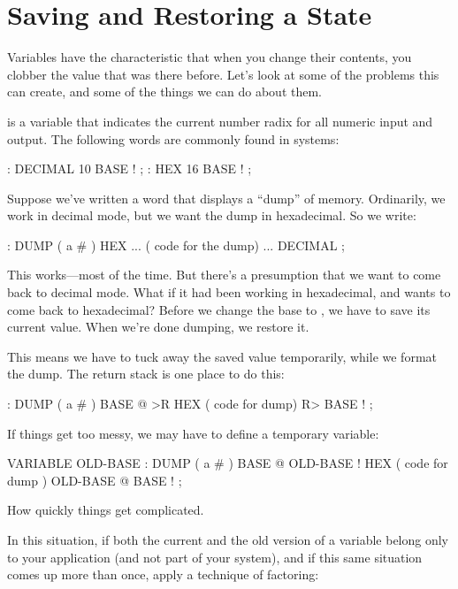 \section{Saving and Restoring a State}

Variables have the characteristic that when you change their contents,
you clobber the value that was there before. Let's look at some of the
problems this can create, and some of the things we can do about them.

 is a variable that indicates the current
number radix for all numeric input and output. The following words are
commonly found in \Forth{} systems:

\begin{Code}
: DECIMAL   10 BASE ! ;
: HEX   16 BASE ! ;
\end{Code}
Suppose we've written a word that displays a ``dump'' of memory. Ordinarily,
we work in decimal mode, but we want the dump in hexadecimal. So we write:

\begin{Code}
: DUMP  ( a # )
   HEX   ...   ( code for the dump) ... DECIMAL ;
\end{Code}
This works---most of the time. But there's a presumption that we want to
come back to decimal mode. What if it had been working in hexadecimal,
and wants to come back to hexadecimal? Before we change the base to
, we have to save its current value. When we're done dumping, we
restore it.

This means we have to tuck away the saved value temporarily,
while we format the dump. The return stack is one place to do this:

\begin{Code}
: DUMP  ( a # )
   BASE @ >R  HEX   ( code for dump)  R> BASE ! ;
\end{Code}
If things get too messy, we may have to define a temporary variable:

\begin{Code}
VARIABLE OLD-BASE
: DUMP  ( a # )
   BASE @  OLD-BASE !  HEX ( code for dump )
   OLD-BASE @  BASE ! ;
\end{Code}
How quickly things get complicated.

In this situation, if both the current and the old version of a variable
belong only to your application (and not part of your system), and if this
same situation comes up more than once, apply a technique of factoring:

